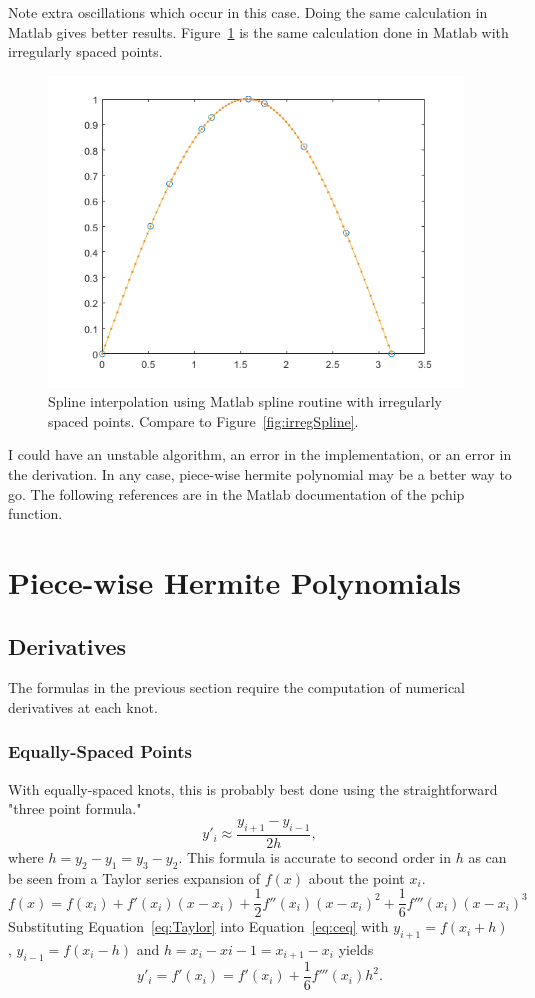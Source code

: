 \documentclass{scrartcl}
\begin{document}
Note extra oscillations which occur in this case.
Doing the same calculation in Matlab gives better results.
Figure~\ref{fig:matSpline} is the same calculation done in Matlab
with irregularly spaced points.
\begin{figure}
\begin{center}
\includegraphics[width=11cm]{matSpline}
\end{center}
\caption{\label{fig:matSpline}Spline interpolation using Matlab
spline routine with irregularly spaced points.
Compare to Figure~\ref{fig:irregSpline}.}
\end{figure}
I could have an unstable algorithm, an error in the implementation,
or an error in the derivation. In any case, piece-wise hermite polynomial
may be a better way to go. The following references are in the Matlab
documentation of the pchip function\cite{Fritsch,Kahaner}.

\section{Piece-wise Hermite Polynomials}
\subsection{Derivatives}
The formulas in the previous section require the computation of
numerical derivatives at each knot.
\subsubsection{Equally-Spaced Points}
With equally-spaced knots, this
is probably best done using the straightforward "three point formula."
\begin{equation}
y'_i \approx \frac{y_{i+1}-y_{i-1}}{2h},\label{eq:ceq}
\end{equation}
where $h=y_2-y_1=y_3-y_2$.
This formula is accurate to second order in $h$ as can be seen
from a Taylor series expansion of $f(x)$ about the point $x_i$.
\begin{equation}
f(x)=f(x_i)+f'(x_i)(x-x_i)+\frac{1}{2}f''(x_i)(x-x_i)^2+
	\frac{1}{6}f'''(x_i)(x-x_i)^3\label{eq:Taylor}
\end{equation}
Substituting Equation~\ref{eq:Taylor} into Equation~\ref{eq:ceq}
with $y_{i+1}=f(x_i+h)$, $y_{i-1}=f(x_i-h)$ and
$h=x_i-x{i-1}=x_{i+1}-x_i$ yields
\begin{equation}
y'_i=f'(x_i)=f'(x_i)+\frac{1}{6}f'''(x_i)h^2.
\end{equation}
\end{document}
